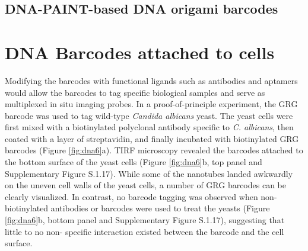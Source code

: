 \subsection{DNA-PAINT-based DNA origami barcodes}

\section{DNA Barcodes attached to cells}
Modifying the barcodes with functional ligands such as antibodies and aptamers 
would allow the barcodes to tag specific biological samples and serve as multiplexed in 
situ imaging probes. In a proof-of-principle experiment, the GRG barcode was used to 
tag wild-type \textit{Candida albicans} yeast. The yeast cells were first mixed with a biotinylated 
polyclonal antibody specific to \textit{C. albicans}, then coated with a layer of streptavidin, and 
finally incubated with biotinylated GRG barcodes (Figure \ref{fig:dna6}a). TIRF microscopy revealed 
the barcodes attached to the bottom surface of the yeast cells (Figure  \ref{fig:dna6}b, top panel and 
Supplementary Figure S.1.17). While some of the nanotubes landed awkwardly on the uneven cell walls of 
the yeast cells, a number of GRG barcodes can be clearly visualized. In contrast, no 
barcode tagging was observed when non-biotinylated antibodies or barcodes were used to 
treat the yeasts (Figure  \ref{fig:dna6}b, bottom panel and Supplementary Figure 
S.1.17), suggesting that little to no non- 
specific interaction existed between the barcode and the cell surface. 


